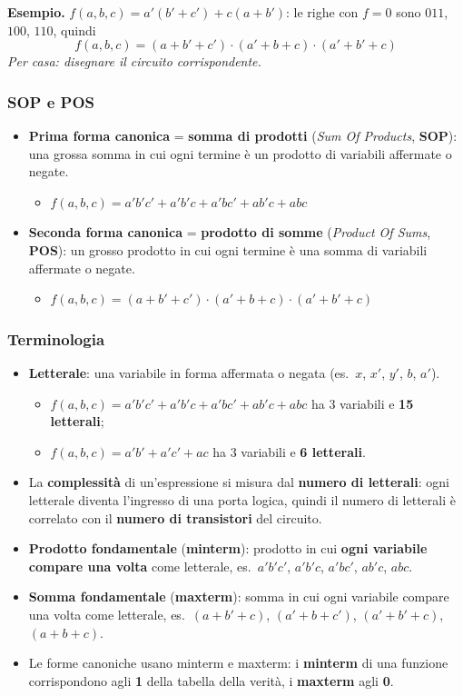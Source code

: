 \documentclass[12pt, a4paper]{article}
\begin{document}
\textbf{Esempio.} $f(a,b,c) = a'(b'+c') + c(a+b')$: le righe con $f = 0$ sono $011$, $100$, $110$, quindi
$$f(a,b,c) = (a + b' + c') \cdot (a' + b + c) \cdot (a' + b' + c)$$
\emph{Per casa: disegnare il circuito corrispondente.}

\subsubsection{SOP e POS}
\begin{itemize}
    \item \textbf{Prima forma canonica} = \textbf{somma di prodotti} (\emph{Sum Of Products}, \textbf{SOP}): una grossa somma in cui ogni termine è un prodotto di variabili affermate o negate.
    \begin{itemize}
        \item $f(a,b,c) = a'b'c' + a'b'c + a'bc' + ab'c + abc$
    \end{itemize}
    \item \textbf{Seconda forma canonica} = \textbf{prodotto di somme} (\emph{Product Of Sums}, \textbf{POS}): un grosso prodotto in cui ogni termine è una somma di variabili affermate o negate.
    \begin{itemize}
        \item $f(a,b,c) = (a + b' + c') \cdot (a' + b + c) \cdot (a' + b' + c)$
    \end{itemize}
\end{itemize}

\subsubsection{Terminologia}
\begin{itemize}
    \item \textbf{Letterale}: una variabile in forma affermata o negata (es.\ $x$, $x'$, $y'$, $b$, $a'$).
    \begin{itemize}
        \item $f(a,b,c) = a'b'c' + a'b'c + a'bc' + ab'c + abc$ ha 3 variabili e \textbf{15 letterali};
        \item $f(a,b,c) = a'b' + a'c' + ac$ ha 3 variabili e \textbf{6 letterali}.
    \end{itemize}
    \item La \textbf{complessità} di un'espressione si misura dal \textbf{numero di letterali}: ogni letterale diventa l'ingresso di una porta logica, quindi il numero di letterali è correlato con il \textbf{numero di transistori} del circuito.
    \item \textbf{Prodotto fondamentale} (\textbf{minterm}): prodotto in cui \textbf{ogni variabile compare una volta} come letterale, es.\ $a'b'c'$, $a'b'c$, $a'bc'$, $ab'c$, $abc$.
    \item \textbf{Somma fondamentale} (\textbf{maxterm}): somma in cui ogni variabile compare una volta come letterale, es.\ $(a + b' + c)$, $(a' + b + c')$, $(a' + b' + c)$, $(a + b + c)$.
    \item Le forme canoniche usano minterm e maxterm: i \textbf{minterm} di una funzione corrispondono agli \textbf{1} della tabella della verità, i \textbf{maxterm} agli \textbf{0}.
\end{itemize}
\end{document}
